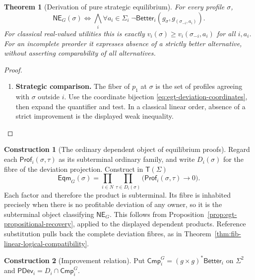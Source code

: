 \documentclass[11pt,a4paper]{article}
\numberwithin{equation}{section}
\newtheorem{theorem}{Theorem}[section]
\theoremstyle{definition}
\newtheorem{construction}[construction]{Construction}
\theoremstyle{remark}
\theoremstyle{plain}
\begin{document}
\begin{theorem}[Derivation of pure strategic equilibrium]
For every profile $\sigma$,
\begin{equation}\label{eq:egt-ne}
 \mathsf{NE}_G(\sigma)
 \iff\bigwedge_i\forall a_i\in\Sigma_i\;
 \neg\mathsf{Better}_i(g_\sigma,g_{(\sigma_{-i},a_i)}).
\end{equation}
For classical real-valued utilities this is exactly
$v_i(\sigma)\geq v_i(\sigma_{-i},a_i)$ for all $i,a_i$.
For an incomplete preorder it expresses absence of a strictly better
alternative, without asserting comparability of all alternatives.
\end{theorem}
\begin{proof}
\leavevmode
\begin{enumerate}[label=\textup{(\arabic*)},leftmargin=*,itemsep=4pt,topsep=3pt]
  \item \textbf{Strategic comparison.} The fiber of $p_1$ at $\sigma$ is the set of profiles agreeing with
$\sigma$ outside $i$. Use the coordinate bijection
\eqref{eq:egt-deviation-coordinates}, then expand the quantifier and test. In a classical linear order, absence of a strict improvement is the
displayed weak inequality.
\end{enumerate}
\end{proof}

\begin{construction}[The ordinary dependent object of equilibrium proofs]
\label{con:egt-equilibrium-type}
Regard each $\mathsf{Prof}_i(\sigma,\tau)$ as its subterminal ordinary
family, and write $D_i(\sigma)$ for the fibre of the deviation projection.
Construct in $\mathsf T(\Sigma)$
\[
 \mathsf{Eqm}_G(\sigma)
 =\prod_{i\in N}\prod_{\tau\in D_i(\sigma)}
       \bigl(\mathsf{Prof}_i(\sigma,\tau)\to0\bigr).
\]
Each factor and therefore the product is subterminal. Its fibre is
inhabited precisely when there is no profitable deviation of any owner,
so it is the subterminal object classifying $\mathsf{NE}_G$.
This follows from Proposition~\ref{prop:egt-propositional-recovery},
applied to the displayed dependent products. Reference substitution
pulls back the complete deviation fibres, as in
Theorem~\ref{thm:fib-linear-logical-compatibility}.
\end{construction}

\begin{construction}[Improvement relation]
Put
$\mathsf{Cmp}_i^G=(g\times g)^*\mathsf{Better}_i$ on $\Sigma^2$ and
$\mathsf{PDev}_i=D_i\cap\mathsf{Cmp}_i^G$.
\end{construction}
\end{document}
